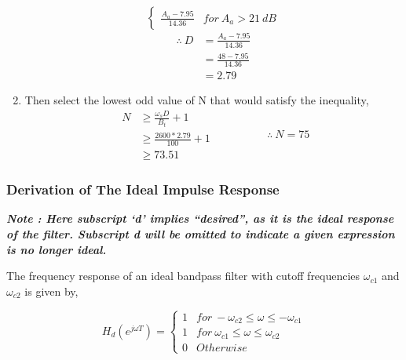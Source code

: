 \documentclass[a4paper,11pt]{article}%
\begin{document}
\begin{enumerate}[\hspace{1cm}a.)]
\[\begin{cases}
	\frac{A_a - 7.95}{14.36} & for ~ A_a > 21 ~dB
\end{cases}
\]\hspace{2cm}
\[
\begin{split}
	\therefore~ D &= \frac{A_a - 7.95}{14.36}\\
	&=\frac{48 - 7.95}{14.36}\\
	&=  2.79
\end{split}
\]

\item Then select the lowest odd value of N that would satisfy the inequality,
\[
\begin{split}
	N  & \geq \frac{\omega_sD}{B_t}+1\\
	&\geq \frac{2600*2.79}{100}+1\\
	&\geq 73.51
\end{split}
\hspace{2cm}
\therefore~	N = 75
\]
\end{enumerate}
\subsubsection{Derivation of The Ideal Impulse Response}

\textbf{\textit{Note : Here subscript `d' implies ``desired'', as it is the ideal response of the filter. Subscript d will be omitted to indicate a given expression is no longer ideal.\\}}

The frequency response of an ideal bandpass filter with cutoff frequencies $\omega_{c1}$ and $\omega_{c2}$ is given by,
  
\[
H_d(e^{j\omega T}) = \begin{cases}
1& for~ -\omega_{c2} \le \omega \le -\omega_{c1}\\
1& for ~\omega_{c1} \le \omega \le \omega_{c2}\\
0& Otherwise
\end{cases}
\]
\end{document}
